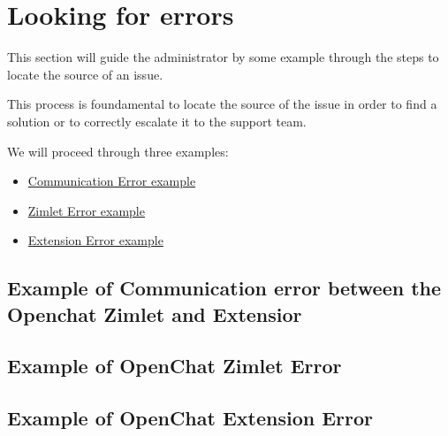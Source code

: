 \section{Looking for errors}

This section will guide the administrator by some example through the steps to locate the source of an issue.

This process is foundamental to locate the source of the issue in order to find a solution or to correctly escalate it
to the support team.

We will proceed through three examples:
\begin{itemize}
    \item \hyperref[{sec:comm_err}]{Communication Error example}
    \item \hyperref[{sec:zim_err}]{Zimlet Error example}
    \item \hyperref[{sec:ext_err}]{Extension Error example}
\end{itemize}

\subsection[Communication Error example]{Example of Communication error between the Openchat Zimlet and Extensior}
\label{sec:comm_err}

\subsection[Zimlet Error example]{Example of OpenChat Zimlet Error}
\label{sec:zim_err}

\subsection[Extension Error example]{Example of OpenChat Extension Error}
\label{sec:ext_err}

